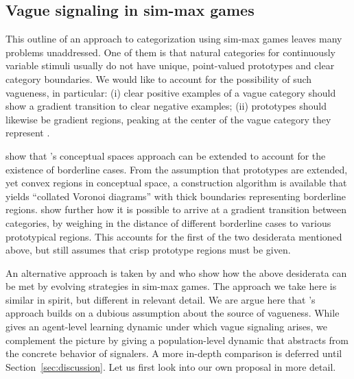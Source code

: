 \documentclass[fleqn,reqno,10pt]{article}
\begin{document}
\subsection{Vague signaling in sim-max games}

This outline of an approach to categorization using sim-max games
leaves many problems unaddressed. One of them is that natural
categories for continuously variable stimuli usually do not have
unique, point-valued prototypes and clear category boundaries. We
would like to account for the possibility of such vagueness, in
particular: (i) clear positive examples of a vague category should
show a gradient transition to clear negative examples;
(ii) prototypes should likewise be gradient regions, peaking at the
center of the vague category they represent
\citep[e.g.][]{Sainsbury1991:Is-There-Higher,KeefeSmith1997:Vagueness:-A-Re}.

\citet{DouvenDecock2011:Vagueness:-A-Co} show that
\citeauthor{Gardenfors2000:Conceptual-Spac}'s conceptual spaces
approach can be extended to account for the existence of borderline
cases. From the assumption that prototypes are extended, yet convex
regions in conceptual space, a construction algorithm is available
that yields ``collated Voronoi diagrams'' with thick boundaries
representing borderline
regions. \citet{DecockDouven2012:What-is-Graded-} show further how it
is possible to arrive at a gradient transition between categories, by
weighing in the distance of different borderline cases to various
prototypical regions. This accounts for the first of the two
desiderata mentioned above, but still assumes that crisp prototype
regions must be given.

An alternative approach is taken by
\citet{FrankeJager2010:Vagueness-Signa} and
\citet{OConnor2013:The-Evolution-o} who show how the above desiderata
can be met by evolving strategies in sim-max games. The approach we
take here is similar in spirit, but different in relevant detail. We
are argue here that \citeauthor{FrankeJager2010:Vagueness-Signa}'s
approach builds on a dubious assumption about the source of
vagueness. While \citeauthor{OConnor2013:The-Evolution-o} gives an
agent-level learning dynamic under which vague signaling arises, we
complement the picture by giving a population-level dynamic that
abstracts from the concrete behavior of signalers. A more in-depth
comparison is deferred until Section~\ref{sec:discussion}. Let us
first look into our own proposal in more detail.
\end{document}

